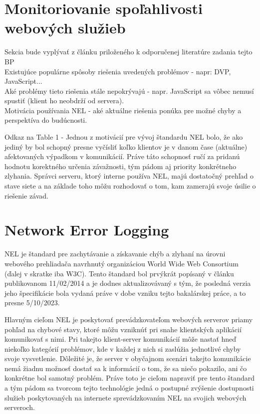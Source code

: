\section{Monitoriovanie spoľahlivosti webových služieb}

Sekcia bude vyplývať z článku priloženého k odporučenej literatúre zadania tejto BP \cite{nel-client-side-measurement-e2e-reliability}
\\
Existujúce populárne spôsoby riešenia uvedených problémov - napr: DVP, JavaScript...
\\
Aké problémy tieto riešenia stále nepokrývajú - napr. JavaScript sa vôbec nemusí spustiť (klient ho neobdrží od servera).
\\
Motivácia používania NEL - aké aktuálne riešenia ponúka pre možné chyby a perspektíva do budúcnosti.


Odkaz na Table 1 - Jednou z motivácií pre vývoj štandardu NEL bolo, že ako jediný by bol schopný presne vyčísliť koľko klientov je
v danom čase (aktuálne) afektovaných výpadkom v komunikácií. Práve táto schopnosť ručí za pridanú hodnotu korektného určenia závažnosti,
tým pádom aj priority konkrétneho zlyhania. Správci serveru, ktorý interne používa NEL, majú dostatočný prehľad o stave siete a na základe 
toho môžu rozhodovať o tom, kam zamerajú svoje úsilie o riešenie závad.    

\section{Network Error Logging}


NEL je štandard pre zachytávanie a získavanie chýb a zlyhaní na úrovni webového prehliadača navrhnutý organizáciou World Wide Web 
Consortium (ďalej v skratke iba W3C). Tento štandard bol prvýkrát popísaný v článku publikovanom 11/02/2014 a je dodnes aktualizovávaný
s tým, že posledná verzia jeho špecifikácie bola vydaná práve v dobe vzniku tejto bakalárskej práce, a to presne 5/10/2023. 

Hlavným cieľom NEL je poskytovať prevádzkovateľom webových serverov priamy pohľad na chybové stavy, ktoré môžu vzniknúť pri snahe 
klientských aplikácií komunikovať s nimi. Pri takejto klient-server komunikácií môže nastať hneď niekoľko kategórií problémov, 
kde v každej z nich si zaslúžia jednotlivé chyby svoje vysvetlenie. Dôležité je, že server v obyčajnom scenári takejto komunikácie 
nemá žiadnu možnosť dostať sa k informácií o tom, že sa niečo pokazilo, ani čo konkrétne bol samotný problém. Práve toto je cieľom 
napraviť pre tento štandard a tým pádom sa tvorcom tejto technológie jedná o postupné zvýšenie dostupnosti služieb poskytovaných 
na internete sprevádzkovaním NEL na svojich webových serveroch.

